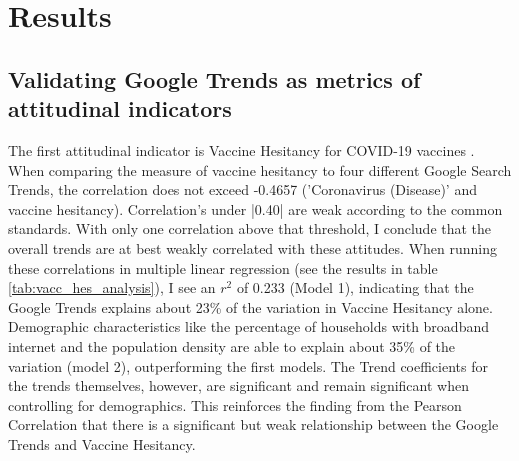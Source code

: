 \section{Results}

\subsection{Validating Google Trends as metrics of attitudinal indicators}




The first attitudinal indicator is Vaccine Hesitancy for COVID-19 vaccines
\citep{vaches_data}. When comparing the measure of vaccine hesitancy to four
different Google Search Trends, the correlation does not exceed -0.4657
('Coronavirus (Disease)' and vaccine hesitancy). Correlation's under |0.40| are 
weak according to the common standards. With only one correlation 
above that threshold, I conclude that the overall trends are at best weakly
correlated with these attitudes. When running these
correlations in multiple linear regression (see the results in table
\ref{tab:vacc_hes_analysis}), I see an $r^2$ of 0.233 (Model 1),
indicating that the Google Trends explains about 23\% of
the variation in Vaccine Hesitancy alone. Demographic characteristics like the
percentage of households with broadband internet and the population density are
able to explain about 35\% of the variation (model 2), outperforming the first
models. The Trend coefficients for the trends themselves, however, are
significant and remain significant when controlling for demographics. This reinforces the finding from the Pearson Correlation that there is a significant but weak relationship between the Google Trends and Vaccine Hesitancy.




